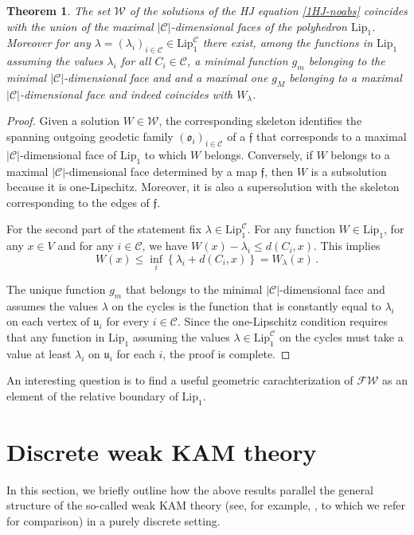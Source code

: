 \documentclass[reqno]{amsart}
\theoremstyle{plain}
\newtheorem{theorem}{Theorem}[section]
\theoremstyle{definition}
\theoremstyle{remark}
\numberwithin{equation}{section}
\numberwithin{theorem}{section}
\newcommand{\<}{\langle}
\renewcommand{\>}{\rangle}
\begin{document}
\begin{theorem}
	The set $\mathcal W$ of the solutions of the HJ equation \eqref{1HJ-noabs} coincides with the union of the maximal $|\mathcal C|$-dimensional faces of the polyhedron $\mathrm{Lip}_1$. Moreover for any $\lambda=(\lambda_i)_{i\in\mathcal C}\in \mathrm{Lip}_1^{\mathcal C}$ there exist, among the functions in $\mathrm{Lip}_1$  assuming the values $\lambda_i$ for all $C_i\in \mathcal C$, a minimal function $g_m$  belonging to the minimal $|\mathcal C|$-dimensional face and and a maximal one $g_M$ belonging to a 	maximal $|\mathcal C|$-dimensional face and indeed coincides with $W_\lambda$.
\end{theorem}
\begin{proof}
	
	Given a solution $W\in\mathcal W$, the corresponding skeleton identifies the spanning outgoing geodetic family $(\mathfrak o_i)_{i\in \mathcal C}$ of a $\mathfrak f$ that corresponds to a maximal $|\mathcal C|$-dimensional face of $\mathrm{Lip}_1$ to which $W$ belongs. Conversely, if $W$ belongs to a maximal $|\mathcal C|$-dimensional face determined by a map $\mathfrak f$, then $W$ is a subsolution because it is one-Lipschitz. Moreover, it is also a supersolution with the skeleton corresponding to the edges of $\mathfrak f$. 
	
	
	For the second part of the statement fix $\lambda\in \mathrm{Lip}_1^{\mathcal C}$. For any function $W\in \mathrm{Lip}_1$, for any $x\in V$ and for  any $i\in \mathcal C$, we have $W(x)-\lambda_i\leq d(C_i,x)$. This implies 
	\[
	W(x)\leq \inf_i \left\{\lambda_i+d(C_i,x)\right\}=W_\lambda(x)\,.
	\]
	
	The unique function $g_m$ that belongs to the minimal $|\mathcal C|$-dimensional face and assumes the values $\lambda$ on the cycles is the function that is constantly equal to $\lambda_i$ on each vertex of $\mathfrak u_i$ for every $i\in \mathcal C$. Since the one-Lipschitz condition requires that any function in $\mathrm{Lip}_1$ assuming the values $\lambda\in \mathrm{Lip}_1^{\mathcal C}$ on the cycles must take a value at least $\lambda_i$ on  $\mathfrak u_i$ for each $i$, the proof is complete.
\end{proof}
An interesting question is to find a useful geometric carachterization of $\mathscr{FW}$ as an element of the relative boundary of $\mathrm{Lip}_1$.


\section{Discrete weak KAM theory}\label{sec:DweakKAM}
In this section, we briefly outline how the above results parallel the general structure of the so-called weak KAM theory (see, for example, \cite{E,F,T}, to which we refer for comparison) in a purely discrete setting.
\end{document}
